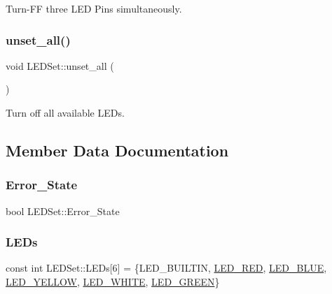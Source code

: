 Turn-\/\+FF three L\+ED Pins simultaneously. 

\mbox{\label{classLEDSet_ae30b2c6d69caeada476829be609b95c2}} 
\subsubsection{\texorpdfstring{unset\+\_\+all()}{unset\_all()}}
{\footnotesize\ttfamily void L\+E\+D\+Set\+::unset\+\_\+all (\begin{DoxyParamCaption}{ }\end{DoxyParamCaption})\hspace{0.3cm}{\ttfamily [inline]}}

Turn off all available L\+E\+Ds. 

\subsection{Member Data Documentation}
\mbox{\label{classLEDSet_aed8105506190d87caa13c36174aa31bd}} 
\subsubsection{\texorpdfstring{Error\+\_\+\+State}{Error\_State}}
{\footnotesize\ttfamily bool L\+E\+D\+Set\+::\+Error\+\_\+\+State}

\mbox{\label{classLEDSet_a6d83c4cf19c09eb8fdb2a6724a8df99e}} 
\subsubsection{\texorpdfstring{L\+E\+Ds}{LEDs}}
{\footnotesize\ttfamily const int L\+E\+D\+Set\+::\+L\+E\+Ds\mbox{[}6\mbox{]} = \{L\+E\+D\+\_\+\+B\+U\+I\+L\+T\+IN, \hyperlink{pins_8hpp_a735f426a390e22c0050b964328c5e06f}{L\+E\+D\+\_\+\+R\+ED}, \hyperlink{pins_8hpp_a8046eca6ddcbe578777cfde489622a13}{L\+E\+D\+\_\+\+B\+L\+UE}, \hyperlink{pins_8hpp_af338796c804fbfe2e9fd4d249e3c5004}{L\+E\+D\+\_\+\+Y\+E\+L\+L\+OW}, \hyperlink{pins_8hpp_a1be903f86639d50fb6ed02a0dbbe0e2c}{L\+E\+D\+\_\+\+W\+H\+I\+TE}, \hyperlink{pins_8hpp_a8d7df4222b2fde6205bebffc5a0ae070}{L\+E\+D\+\_\+\+G\+R\+E\+EN}\}}

